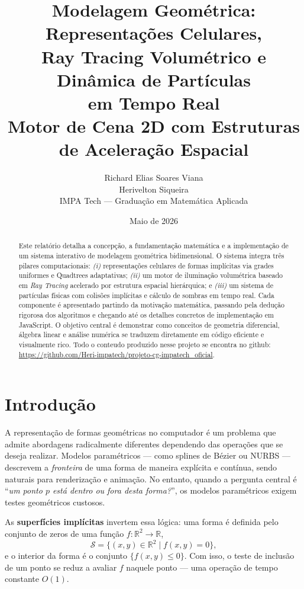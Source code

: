 \documentclass[11pt,a4paper]{article}
\title{%
  \textbf{Modelagem Geométrica: Representações Celulares,}\\[4pt]
  \textbf{Ray Tracing Volumétrico e Dinâmica de Partículas}\\[4pt]
  \textbf{em Tempo Real}\\[12pt]
  \large Motor de Cena 2D com Estruturas de Aceleração Espacial
}
\author{%
  Richard Elias Soares Viana\\
  Herivelton Siqueira\\
  \small IMPA Tech --- Graduação em Matemática Aplicada
}
\date{Maio de 2026}
\theoremstyle{plain}
\theoremstyle{definition}
\newcommand{\R}{\mathbb{R}}
\begin{document}
\maketitle
\tableofcontents
\newpage

\begin{abstract}
Este relatório detalha a concepção, a fundamentação matemática e a implementação
de um sistema interativo de modelagem geométrica bidimensional. O sistema integra
três pilares computacionais: \emph{(i)} representações celulares de formas
implícitas via grades uniformes e Quadtrees adaptativas; \emph{(ii)} um motor de
iluminação volumétrica baseado em \textit{Ray Tracing} acelerado por estrutura
espacial hierárquica; e \emph{(iii)} um sistema de partículas físicas com
colisões implícitas e cálculo de sombras em tempo real. Cada componente é
apresentado partindo da motivação matemática, passando pela dedução rigorosa dos
algoritmos e chegando até os detalhes concretos de implementação em JavaScript.
O objetivo central é demonstrar como conceitos de geometria diferencial, álgebra
linear e análise numérica se traduzem diretamente em código eficiente e
visualmente rico. Todo o conteudo produzido nesse projeto se encontra no github: \url{https://github.com/Heri-impatech/projeto-cg-impatech_oficial}.
\end{abstract}

\newpage

\section{Introdução}

A representação de formas geométricas no computador é um problema que admite
abordagens radicalmente diferentes dependendo das operações que se deseja
realizar. Modelos paramétricos — como splines de Bézier ou NURBS — descrevem
a \emph{fronteira} de uma forma de maneira explícita e contínua, sendo naturais
para renderização e animação. No entanto, quando a pergunta central é
``\emph{um ponto $p$ está dentro ou fora desta forma?}'', os modelos
paramétricos exigem testes geométricos custosos.

As \textbf{superfícies implícitas} invertem essa lógica: uma forma é definida
pelo conjunto de zeros de uma função $f : \R^2 \to \R$,
\[
    \mathcal{S} = \{ (x, y) \in \R^2 \mid f(x, y) = 0 \},
\]
e o interior da forma é o conjunto $\{ f(x,y) \leq 0 \}$. Com isso, o teste de
inclusão de um ponto se reduz a avaliar $f$ naquele ponto --- uma operação de
tempo constante $O(1)$.
\end{document}
